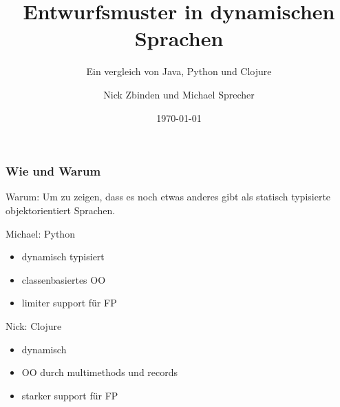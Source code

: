 \documentclass[compress, red]{beamer}
\begin{document}
\title{Entwurfsmuster in dynamischen Sprachen}
\subtitle{Ein vergleich von Java, Python und Clojure}
\author{Nick Zbinden und Michael Sprecher}
\date{\today}

\begin{frame}
  \titlepage
\end{frame}

\begin{frame}\frametitle{Wie und Warum}
\begin{center}

\begin{block}{Warum:}
  Um zu zeigen, dass es noch etwas anderes gibt als statisch
  typisierte objektorientiert Sprachen.
\end{block}


\begin{block}{Michael: Python}
  \begin{itemize}
    \item dynamisch typisiert
    \item classenbasiertes OO
    \item limiter support für FP
  \end{itemize}
\end{block} 

\begin{block}{Nick: Clojure}
  \begin{itemize}
    \item dynamisch
    \item OO durch multimethods und records
    \item starker support für FP
  \end{itemize}
\end{block}

\end{center}
\end{frame}
\end{document}
